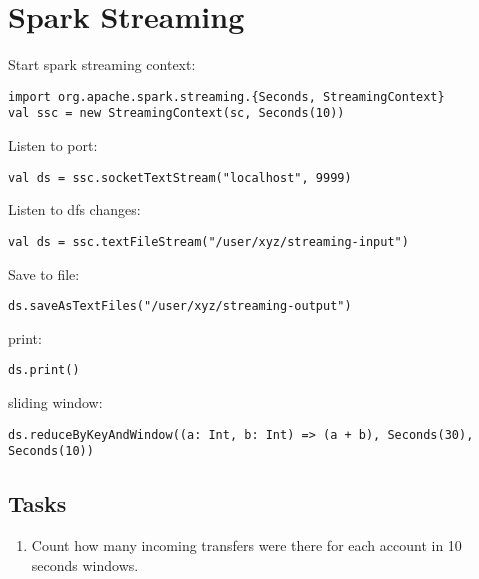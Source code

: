 \documentclass{article}
\begin{document}
\section*{Spark Streaming}

Start spark streaming context:
\begin{lstlisting}[]
import org.apache.spark.streaming.{Seconds, StreamingContext}
val ssc = new StreamingContext(sc, Seconds(10))
\end{lstlisting}

Listen to port:
\begin{lstlisting}[]
val ds = ssc.socketTextStream("localhost", 9999)
\end{lstlisting}

Listen to dfs changes:
\begin{lstlisting}[]
val ds = ssc.textFileStream("/user/xyz/streaming-input")
\end{lstlisting}


Save to file:
\begin{lstlisting}[]
ds.saveAsTextFiles("/user/xyz/streaming-output")
\end{lstlisting}

print:
\begin{lstlisting}[]
ds.print()
\end{lstlisting}

sliding window:
\begin{lstlisting}[]
ds.reduceByKeyAndWindow((a: Int, b: Int) => (a + b), Seconds(30), Seconds(10))
\end{lstlisting}

\subsection*{Tasks}

\begin{enumerate}
\item Count how many incoming transfers were there for each account in 10 seconds windows.
\end{enumerate}
\end{document}
